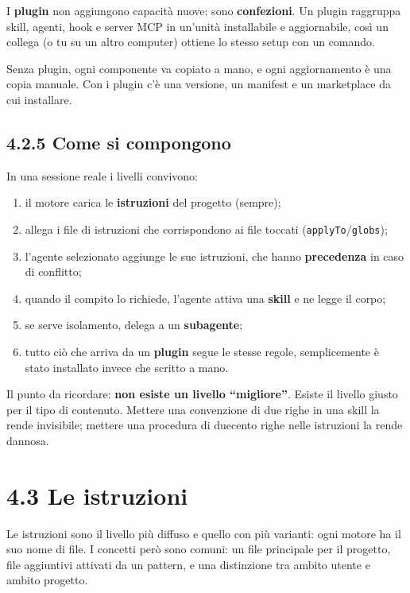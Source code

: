\documentclass[
  italian,
  10pt,
]{book}
\providecommand{\tightlist}{%
  \setlength{\itemsep}{0pt}\setlength{\parskip}{0pt}}
\begin{document}
I \textbf{plugin} non aggiungono capacità nuove: sono
\textbf{confezioni}. Un plugin raggruppa skill, agenti, hook e server
MCP in un'unità installabile e aggiornabile, così un collega (o tu su un
altro computer) ottiene lo stesso setup con un comando.

Senza plugin, ogni componente va copiato a mano, e ogni aggiornamento è
una copia manuale. Con i plugin c'è una versione, un manifest e un
marketplace da cui installare.

\subsection{4.2.5 Come si compongono}\label{come-si-compongono}

In una sessione reale i livelli convivono:

\begin{enumerate}
\def\labelenumi{\arabic{enumi}.}
\tightlist
\item
  il motore carica le \textbf{istruzioni} del progetto (sempre);
\item
  allega i file di istruzioni che corrispondono ai file toccati
  (\texttt{applyTo}/\texttt{globs});
\item
  l'agente selezionato aggiunge le sue istruzioni, che hanno
  \textbf{precedenza} in caso di conflitto;
\item
  quando il compito lo richiede, l'agente attiva una \textbf{skill} e ne
  legge il corpo;
\item
  se serve isolamento, delega a un \textbf{subagente};
\item
  tutto ciò che arriva da un \textbf{plugin} segue le stesse regole,
  semplicemente è stato installato invece che scritto a mano.
\end{enumerate}

Il punto da ricordare: \textbf{non esiste un livello ``migliore''}.
Esiste il livello giusto per il tipo di contenuto. Mettere una
convenzione di due righe in una skill la rende invisibile; mettere una
procedura di duecento righe nelle istruzioni la rende dannosa.

\section{4.3 Le istruzioni}\label{le-istruzioni}

Le istruzioni sono il livello più diffuso e quello con più varianti:
ogni motore ha il suo nome di file. I concetti però sono comuni: un file
principale per il progetto, file aggiuntivi attivati da un pattern, e
una distinzione tra ambito utente e ambito progetto.
\end{document}
